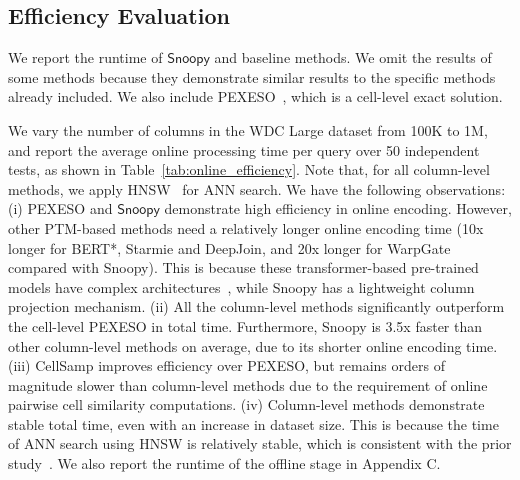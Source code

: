 \subsection{Efficiency Evaluation}
\label{subsec:efficiency}



We report the runtime of $\textsf{Snoopy}$ and baseline methods. We omit the results of some methods because they demonstrate similar results to the specific methods already included. We also include PEXESO~\cite{Pexeso}, which is a cell-level exact solution.

We vary the number of columns in the WDC Large dataset from 100K to 1M, and report the average online processing time per query over 50 independent tests, as shown in Table~\ref{tab:online_efficiency}. 
Note that, for all column-level methods, we apply HNSW~\cite{HNSW} for ANN search.
We have the following observations:
(i) PEXESO and $\textsf{Snoopy}$ demonstrate high efficiency in online encoding. However, other PTM-based methods need a relatively longer online encoding time (10x longer for BERT*,  Starmie and DeepJoin, and 20x longer for WarpGate compared with \textsf{Snoopy}). This is because these transformer-based pre-trained models have complex architectures~\cite{FCS}, while \textsf{Snoopy} has a lightweight column projection mechanism. 
(ii) All the column-level methods significantly outperform the cell-level PEXESO in total time. Furthermore, \textsf{Snoopy} is 3.5x faster than other column-level methods on average, due to its shorter online encoding time.
(iii) CellSamp improves efficiency over PEXESO, but remains orders of magnitude slower than column-level methods due to the requirement of online pairwise cell similarity computations. 
(iv) Column-level methods demonstrate stable total time, even with an increase in dataset size. This is because the time of ANN search using HNSW is relatively stable, which is consistent with the prior study~\cite{Deepjoin}.
We also report the runtime of the offline stage in Appendix C.
 


